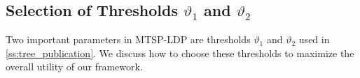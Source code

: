 
\subsection{Selection of Thresholds $\vartheta_1$ and $\vartheta_2$}



Two important parameters in MTSP-LDP are thresholds $\vartheta_1$ and $\vartheta_2$
used in \cref{ss:tree_publication}.
We discuss how to choose these thresholds to maximize the overall utility of our
framework.




